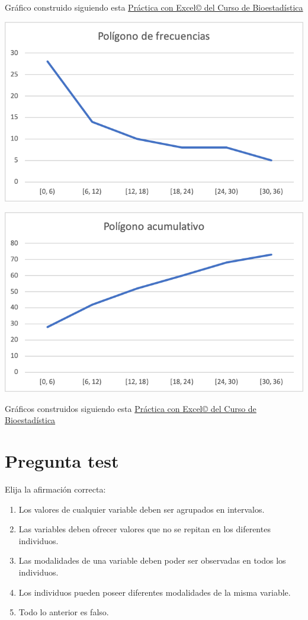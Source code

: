 \documentclass[
]{book}
\providecommand{\tightlist}{%
  \setlength{\itemsep}{0pt}\setlength{\parskip}{0pt}}
\begin{document}
Gráfico construido siguiendo esta \href{https://1fjmanzano.github.io/bioestadistica/histogramas.html\#histogramas-con-excel-pr\%C3\%A1cticas}{Práctica con Excel© del Curso de Bioestadística}

\includegraphics[width=10.03in]{img/1_4}

\includegraphics[width=10.03in]{img/1_5}

Gráficos construidos siguiendo esta \href{https://1fjmanzano.github.io/bioestadistica/nu\%CC\%81meros-i\%CC\%81ndices.html\#n\%C3\%BAmeros-\%C3\%ADndices-pr\%C3\%A1ctica-con-excel}{Práctica con Excel© del Curso de Bioestadística}

\hypertarget{pregunta-test-11}{%
\section{Pregunta test}\label{pregunta-test-11}}

Elija la afirmación correcta:

\begin{enumerate}
\def\labelenumi{\alph{enumi})}
\tightlist
\item
  Los valores de cualquier variable deben ser agrupados en intervalos.
\item
  Las variables deben ofrecer valores que no se repitan en los diferentes individuos.
\item
  Las modalidades de una variable deben poder ser observadas en todos los individuos.
\item
  Los individuos pueden poseer diferentes modalidades de la misma variable.
\item
  Todo lo anterior es falso.
\end{enumerate}
\end{document}
